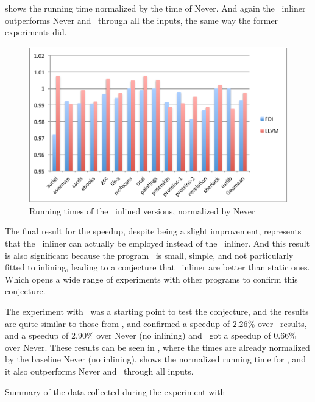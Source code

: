  shows the running time normalized by the time of Never. And again the \FDI\ inliner outperforms Never and \llvm\ through all the inputs, the same way the former experiments did. %

\begin{figure}
  \centering
  \includegraphics[width=1.00\linewidth]{Figures/speedupbzipall}
  \caption{Running times of the \bzip\ inlined versions, normalized by Never}
  \label{fig:speedup}
\end{figure}

The final result for the speedup, despite being a slight improvement, represents that the \FDI\ inliner can actually be employed instead of the \llvm\ inliner. And this result is also significant because the program \bzip\ is small, simple, and not particularly fitted to inlining, leading to a conjecture that \FDI\ inliner are better than static ones. Which opens a wide range of experiments with other programs to confirm this conjecture.

The experiment with \gzip\ was a starting point to test the conjecture, and the results are quite similar to those from \bzip, and confirmed a speedup of $2.26 \%$ over \llvm\ results, and a speedup of $2.90 \%$ over Never (no inlining) and \llvm\ got a speedup of $0.66 \%$ over Never. These results can be seen in , where the times are already normalized by the baseline Never (no inlining).  shows the normalized running time for \gzip, and it also outperforms Never and \llvm\ through all inputs.

\begin{table}
  \centering
  \begin{tiny}
  
  \end{tiny}
  \caption{Summary of the data collected during the experiment with \gzip}
  \label{tab:speedupz}
\end{table}

